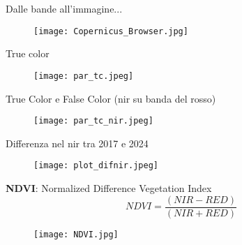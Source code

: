 \documentclass{beamer} %
\begin{document}
\begin{frame}{Dalle bande all'immagine...}
 \begin{multicols}{2}
    
    \columnbreak
    \begin{figure}
        \raggedleft %
        \texttt{[image: Copernicus\_Browser.jpg]}
    \end{figure}
    \end{multicols}
\end{frame}

\begin{frame}{True color}

\begin{figure}
    \centering
    \texttt{[image: par\_tc.jpeg]}
        \end{figure}
        \end{frame}

\begin{frame}{True Color e False Color (nir su banda del rosso)}
\begin{figure}
    \centering
    \texttt{[image: par\_tc\_nir.jpeg]}
\end{figure}
        \end{frame}

\begin{frame}{Differenza nel nir tra 2017 e 2024}

    \begin{figure}
        \centering
        \texttt{[image: plot\_difnir.jpeg]}
    \end{figure}
\end{frame}

 \begin{frame}{\textbf{NDVI}: Normalized Difference Vegetation Index}
            \begin{equation}
                NDVI = \frac{(NIR - RED)}{(NIR + RED)}
            \end{equation}
            \begin{figure}
                \centering
                \texttt{[image: NDVI.jpg]}
            \end{figure}
        \end{frame}
\end{document}
